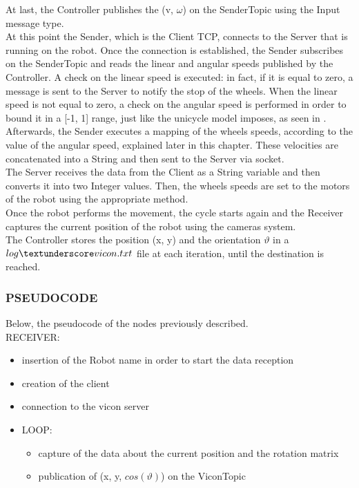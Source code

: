 \documentclass[a4paper,11pt,oneside]{book}
\begin{document}
At last, the Controller publishes the (v, $\omega$) on the SenderTopic using the Input message type.
\\ At this point the Sender, which is the Client TCP, connects to the Server that is running on the robot. Once the connection is established, the Sender subscribes on the SenderTopic and reads the linear and angular speeds published by the Controller. A check on the linear speed is executed: in fact, if it is equal to zero, a message is sent to the Server to notify the stop of the wheels. When the linear speed is not equal to zero, a check on the angular speed is performed in order to bound it in a [-1, 1] range, just like the unicycle model imposes, as seen in \cite{MR-GB:55}.
\\ Afterwards, the Sender executes a mapping of the wheels speeds, according to the value of the angular speed, explained later in this chapter. These velocities are concatenated into a String and then sent to the Server via socket.
\\ The Server receives the data from the Client as a String variable and then converts it into two Integer values. Then, the wheels speeds are set to the motors of the robot using the appropriate method.
\\ Once the robot performs the movement, the cycle starts again and the Receiver captures the current position of the robot using the cameras system.
\\ The Controller stores the position (x, y) and the orientation $\vartheta$ in a  $log\textunderscore vicon.txt$ file at each iteration, until the destination is reached.

\subsubsection{PSEUDOCODE}
Below, the pseudocode of the nodes previously described.\\

RECEIVER:
\begin{itemize}
\item insertion of the Robot name in order to start the data reception
\item creation of the client
\item connection to the vicon server
\item LOOP:
\begin{itemize}
\item capture of the data about the current position and the rotation matrix
\item publication of (x, y, $cos(\vartheta)$) on the ViconTopic
\end{itemize}
\end{itemize}
\end{document}
